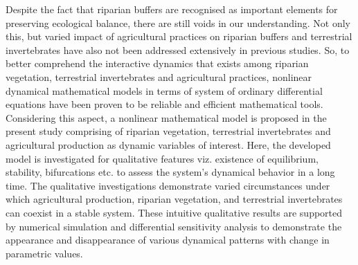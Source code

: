 \documentclass[12pt]{article}
\numberwithin{equation}{section}
\begin{document}
Despite the fact that riparian buffers are recognised as important elements for preserving ecological balance, there are still voids in our understanding. Not only this, but varied impact of agricultural practices on riparian buffers and terrestrial invertebrates have also not been addressed extensively in previous studies. So, to better comprehend the interactive dynamics that exists among riparian vegetation, terrestrial invertebrates and agricultural practices, nonlinear dynamical mathematical models in terms of system of ordinary differential equations have been proven to be reliable and efficient mathematical tools.  Considering this aspect, a nonlinear mathematical model is proposed in the present study comprising of riparian vegetation, terrestrial invertebrates and agricultural production as dynamic variables of interest. Here, the developed model is investigated for qualitative features viz. existence of equilibrium, stability, bifurcations etc. to assess the system's dynamical behavior in a long time. The qualitative investigations demonstrate varied circumstances under which agricultural production, riparian vegetation, and terrestrial invertebrates can coexist in a stable system. These intuitive qualitative results are supported by numerical simulation and differential sensitivity analysis to demonstrate the appearance and disappearance of various dynamical patterns with change in parametric values.
\end{document}
